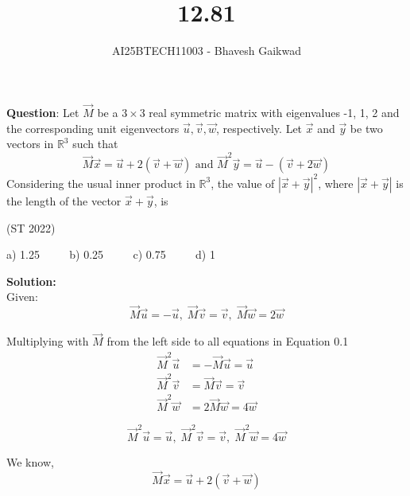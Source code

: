 \documentclass[journal]{IEEEtran}
\begin{document}

\vspace{3cm}

\title{12.81}
\author{AI25BTECH11003 - Bhavesh Gaikwad}
{\let\newpage\relax\maketitle}

\renewcommand{\thefigure}{\theenumi}
\renewcommand{\thetable}{\theenumi}
\setlength{\intextsep}{10pt} 

\renewcommand{\thetable}{\theenumi}


\textbf{Question}: Let $\vec{M}$ be a $3\times3$ real symmetric matrix with eigenvalues -1, 1, 2 and the corresponding unit eigenvectors $\vec{u}, \vec{v},\vec{w}$, respectively. Let $\vec{x}$ and $\vec{y}$ be two vectors in $\mathbb{R}^3$ such that
$$\vec{M}\vec{x} = \vec{u} + 2(\vec{v} + \vec{w}) \text{ and } \vec{M}^2\vec{y} = \vec{u} - (\vec{v} + 2\vec{w})$$
Considering the usual inner product in $\mathbb{R}^3$, the value of $|\vec{x} + \vec{y}|^2$, where $|\vec{x} + \vec{y}|$ is the
length of the vector $\vec{x} + \vec{y}$, is

\hfill{(ST 2022)}

a) 1.25 $\qquad$ b) 0.25 $\qquad$ c) 0.75 $\qquad$ d) 1

\bigskip
 
\textbf{Solution:}\\
Given:
\begin{equation}
\vec{M}\vec{u} = - \vec{u}, \; \vec{M}\vec{v} = \vec{v}, \; \vec{M}\vec{w} = 2\vec{w}
\end{equation}

Multiplying with $\vec{M}$ from the left side to all equations in Equation 0.1
\begin{align}
    \vec{M}^2\vec{u} &= - \vec{M}\vec{u} = \vec{u} \\
    \vec{M}^2\vec{v} &= \vec{M}\vec{v} = \vec{v}\\
    \vec{M}^2\vec{w} &= 2\vec{M}\vec{w} = 4\vec{w}
\end{align}

\begin{equation}
\vec{M}^2\vec{u} = \vec{u}, \; \vec{M}^2\vec{v} = \vec{v}, \; \vec{M}^2\vec{w} = 4\vec{w}
\end{equation}

We know,
\begin{equation}
    \vec{M}\vec{x} = \vec{u} + 2(\vec{v} + \vec{w})
\end{equation}
\end{document}
